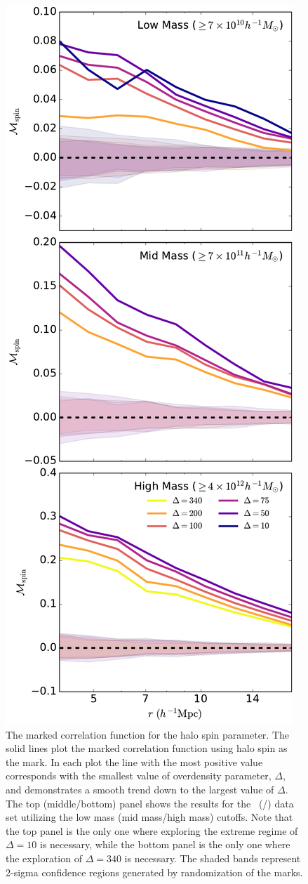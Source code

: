 \documentclass[usenatbib]{mnras}
\begin{document}
\begin{figure}
	\centering
	\includegraphics[width=.4\textwidth]{all_mcf_spin.pdf}
	\caption{The marked correlation function for the halo spin parameter. The solid lines plot the marked correlation function using halo spin as the mark. In each plot the line with the most 
positive value corresponds with the smallest value of overdensity parameter, 
$\Delta$, and demonstrates a smooth trend down to the largest value of 
$\Delta$. The top (middle/bottom) panel shows the results for the
\simA \ (\simB /\simC) data set utilizing the low mass (mid mass/high mass) cutoffs. Note
that the top panel is the only one where exploring the extreme regime of $\Delta = 10$ is
necessary, while the bottom panel is the only one where the exploration of $\Delta = 340$
is necessary. The shaded bands represent 2-sigma confidence regions generated by randomization of the marks.
	}
	\label{fig:cc_mcf_spin}
\end{figure}
\end{document}
